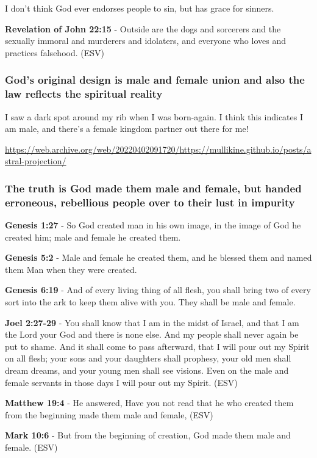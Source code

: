 \documentclass[11pt]{article}
\begin{document}
I don't think God ever endorses people to sin, but has grace for sinners.

\textbf{Revelation of John 22:15} - Outside are the dogs and sorcerers and the sexually immoral and murderers and idolaters, and everyone who loves and practices falsehood. (ESV)

\subsubsection{God's original design is male and female union and also the law reflects the spiritual reality}
\label{sec:org049de21}

I saw a dark spot around my rib when I was born-again.
I think this indicates I am male, and there's a female kingdom partner out there for me!

\url{https://web.archive.org/web/20220402091720/https://mullikine.github.io/posts/astral-projection/}

\subsubsection{The truth is God made them male and female, but handed erroneous, rebellious people over to their lust in impurity}
\label{sec:org40a73eb}
\textbf{Genesis 1:27} - So God created man in his own image, in the image of God he created him; male and female he created them.

\textbf{Genesis 5:2} - Male and female he created them, and he blessed them and named them Man when they were created.

\textbf{Genesis 6:19} - And of every living thing of all flesh, you shall bring two of every sort into the ark to keep them alive with you. They shall be male and female.

\textbf{Joel 2:27-29} - You shall know that I am in the midst of Israel, and that I am the Lord your God and there is none else. And my people shall never again be put to shame. And it shall come to pass afterward, that I will pour out my Spirit on all flesh; your sons and your daughters shall prophesy, your old men shall dream dreams, and your young men shall see visions. Even on the male and female servants in those days I will pour out my Spirit. (ESV)

\textbf{Matthew 19:4} - He answered, Have you not read that he who created them from the beginning made them male and female, (ESV)

\textbf{Mark 10:6} - But from the beginning of creation, God made them male and female. (ESV)
\end{document}
